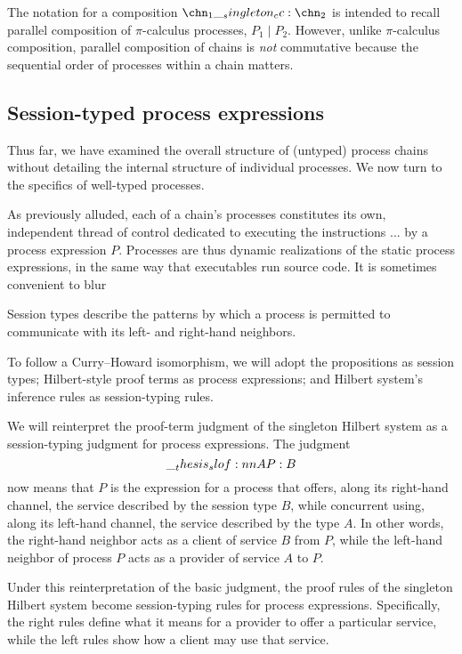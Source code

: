 The notation for a composition $\chn_1 \cc \chn_2$ is intended to recall parallel composition of $\pi$-calculus processes, $P_1 \mid P_2$.
However, unlike $\pi$-calculus composition, parallel composition of chains is \emph{not} commutative because the sequential order of processes within a chain matters.


\subsection{Session-typed process expressions}

Thus far, we have examined the overall structure of (untyped) process chains without detailing the internal structure of individual processes.
We now turn to the specifics of well-typed processes.

As previously alluded, each of a chain's processes constitutes its own, independent thread of control dedicated to executing the instructions ... by a process expression $P$.
Processes are thus dynamic realizations of the static process expressions, in the same way that executables run source code.
It is sometimes convenient to blur

Session types describe the patterns by which a process is permitted to communicate with its left- and right-hand neighbors.

To follow a Curry--Howard isomorphism, we will adopt the propositions as session types; Hilbert-style proof terms as process expressions; and Hilbert system's inference rules as session-typing rules.

We will reinterpret the proof-term judgment of the singleton Hilbert system as a session-typing judgment for process expressions.
The judgment
\begin{equation*}
  \slof{A |- P : B} %
\end{equation*}
now means that $P$ is the expression for a process that
offers, along its right-hand channel, the service described by the session type $B$, while concurrent using, along its left-hand channel, the service described by the type $A$.
In other words, the right-hand neighbor acts as a client of service $B$ from $P$, while the left-hand neighbor of process $P$ acts as a provider of service $A$ to $P$.

Under this reinterpretation of the basic judgment, the proof rules of the singleton Hilbert system become session-typing rules for process expressions.
Specifically, the right rules define what it means for a provider to offer a particular service, while the left rules show how a client may use that service.

